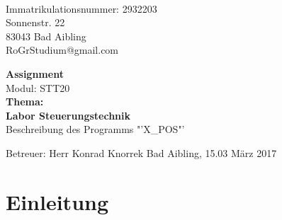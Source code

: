 \documentclass[12pt,a4paper]{scrartcl}	%
\begin{document}
\begin{titlepage}
	\\
	Immatrikulationsnummer:	2932203\\
	Sonnenstr. 22\\
	83043 Bad Aibling\\
	RoGrStudium@gmail.com\\
	\vspace{5cm}
	
	\begin{center}
		{\Huge \textbf{Assignment} }\\ 
		Modul: STT20\\
		\vspace{1cm}
		\textbf{Thema:}\\
		\textbf{\large{Labor Steuerungstechnik}}\\
		Beschreibung des Programms "'X\_POS"'
	\end{center}
	
	\vspace{6cm}
	Betreuer: Herr Konrad Knorrek
	\vfill Bad Aibling, 15.03 März 2017

\end{titlepage}
\newpage

\clearpage
\thispagestyle{empty}

\tableofcontents
\newpage
\clearpage
\thispagestyle{empty}
\listoffigures
\newpage

\setcounter{page}{1}
\section{Einleitung}
\end{document}
